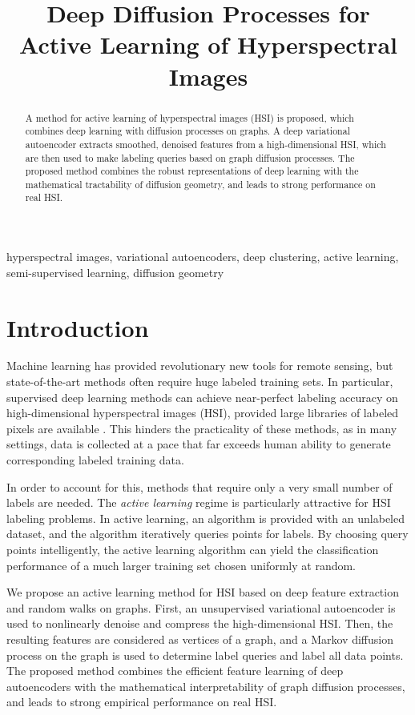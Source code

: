 \documentclass{article}
\title{Deep Diffusion Processes for Active Learning of Hyperspectral Images}
\begin{document}
\maketitle

\begin{abstract} A method for active learning of hyperspectral images (HSI) is proposed, which combines deep learning with diffusion processes on graphs.  A deep variational autoencoder extracts smoothed, denoised features from a high-dimensional HSI, which are then used to make labeling queries based on graph diffusion processes.  The proposed method combines the robust representations of deep learning with the mathematical tractability of diffusion geometry, and leads to strong performance on real HSI.  

\end{abstract}

\begin{keywords}hyperspectral images, variational autoencoders, deep clustering, active learning, semi-supervised learning, diffusion geometry\end{keywords}

\section{Introduction}
\label{sec:Introduction}
 
 Machine learning has provided revolutionary new tools for remote sensing, but state-of-the-art methods often require huge labeled training sets.  In particular, supervised deep learning methods can achieve near-perfect labeling accuracy on high-dimensional hyperspectral images (HSI), provided large libraries of labeled pixels are available \cite{Zhu2017_Deep}.  This hinders the practicality of these methods, as in many settings, data is collected at a pace that far exceeds human ability to generate corresponding labeled training data.
 
 In order to account for this, methods that require only a very small number of labels are needed.  The \emph{active learning} regime is particularly attractive for HSI labeling problems.  In active learning, an algorithm is provided with an unlabeled dataset, and the algorithm iteratively queries points for labels.  By choosing query points intelligently, the active learning algorithm can yield the classification performance of a much larger training set chosen uniformly at random.  
 
We propose an active learning method for HSI based on deep feature extraction and random walks on graphs.  First, an unsupervised variational autoencoder is used to nonlinearly denoise and compress the high-dimensional HSI.  Then, the resulting features are considered as vertices of a graph, and a Markov diffusion process on the graph is used to determine label queries and label all data points.  The proposed method combines the efficient feature learning of deep autoencoders with the mathematical interpretability of graph diffusion processes, and leads to strong empirical performance on real HSI.  
\end{document}
